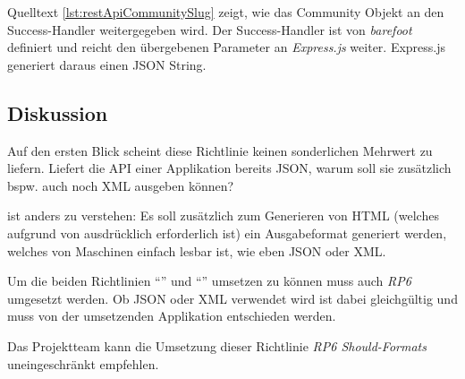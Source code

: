Quelltext \ref{lst:restApiCommunitySlug} zeigt, wie das Community Objekt an den Success-Handler weitergegeben wird. Der Success-Handler ist von \emph{barefoot} definiert und reicht den übergebenen Parameter an \emph{Express.js} weiter. Express.js generiert daraus einen JSON String.

\subsection*{Diskussion}
Auf den ersten Blick scheint diese Richtlinie keinen sonderlichen Mehrwert zu liefern. Liefert die API einer Applikation bereits JSON, warum soll sie zusätzlich bspw. auch noch XML ausgeben können?

 ist anders zu verstehen: Es soll zusätzlich zum Generieren von HTML (welches aufgrund von  ausdrücklich erforderlich ist) ein Ausgabeformat generiert werden, welches von Maschinen einfach lesbar ist, wie eben JSON oder XML.

Um die beiden Richtlinien ``'' und ``'' umsetzen zu können muss auch \emph{RP6} umgesetzt werden. Ob JSON oder XML verwendet wird ist dabei gleichgültig und muss von der umsetzenden Applikation entschieden werden.

Das Projektteam kann die Umsetzung dieser Richtlinie \emph{RP6 Should-Formats} uneingeschränkt empfehlen.